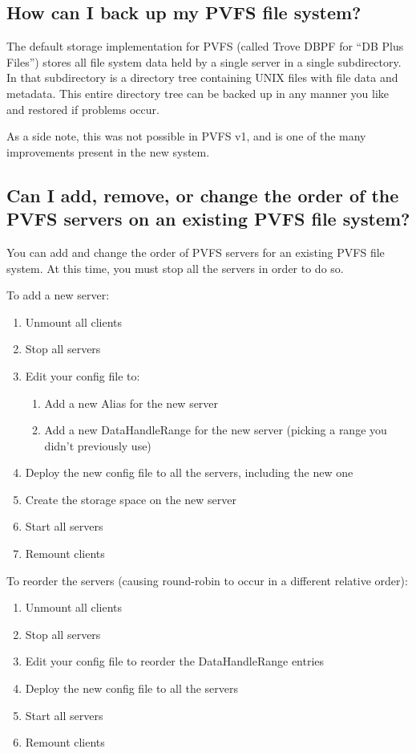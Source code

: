 \documentclass[11pt,letterpaper]{article}
\begin{document}
\subsection{How can I back up my PVFS file system?}

The default storage implementation for PVFS (called Trove DBPF for ``DB Plus
Files'') stores all file system data held by a single server in a single
subdirectory.  In that subdirectory is a directory tree containing UNIX files
with file data and metadata.
%
This entire directory tree can be backed up in any manner you like and
restored if problems occur.

As a side note, this was not possible in PVFS v1, and is one of the many
improvements present in the new system.

\subsection{Can I add, remove, or change the order of the PVFS servers
            on an existing PVFS file system?}

You can add and change the order of PVFS servers for an existing PVFS file
system.  At this time, you must stop all the servers in order to do so.

To add a new server:
\begin{enumerate}
\item Unmount all clients
\item Stop all servers
\item Edit your config file to:
  \begin{enumerate}
  \item Add a new Alias for the new server
  \item Add a new DataHandleRange for the new server (picking a range you
        didn't previously use)
  \end{enumerate}
\item Deploy the new config file to all the servers, including the new one
\item Create the storage space on the new server
\item Start all servers
\item Remount clients
\end{enumerate}

To reorder the servers (causing round-robin to occur in a different relative
order):
\begin{enumerate}
\item Unmount all clients
\item Stop all servers
\item Edit your config file to reorder the DataHandleRange entries
\item Deploy the new config file to all the servers
\item Start all servers
\item Remount clients
\end{enumerate}
\end{document}
